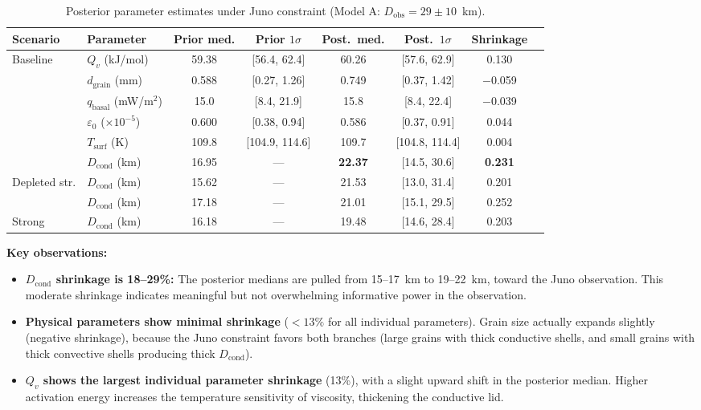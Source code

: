 \documentclass[11pt,letterpaper]{article}
\begin{document}
\begin{table}[htbp]
\centering
\caption{Posterior parameter estimates under Juno constraint (Model A: $D_\mathrm{obs} = 29 \pm 10$~km).}
\label{tab:posterior_A}
\small
\begin{tabular}{@{}llcccccc@{}}
\toprule
\textbf{Scenario} & \textbf{Parameter} & \textbf{Prior med.} & \textbf{Prior $1\sigma$} & \textbf{Post.\ med.} & \textbf{Post.\ $1\sigma$} & \textbf{Shrinkage} \\
\midrule
\multirow{5}{*}{Baseline}
  & $Q_v$ (kJ/mol) & 59.38 & [56.4, 62.4] & 60.26 & [57.6, 62.9] & 0.130 \\
  & $d_\mathrm{grain}$ (mm) & 0.588 & [0.27, 1.26] & 0.749 & [0.37, 1.42] & $-$0.059 \\
  & $q_\mathrm{basal}$ (mW/m$^2$) & 15.0 & [8.4, 21.9] & 15.8 & [8.4, 22.4] & $-$0.039 \\
  & $\varepsilon_0$ ($\times 10^{-5}$) & 0.600 & [0.38, 0.94] & 0.586 & [0.37, 0.91] & 0.044 \\
  & $T_\mathrm{surf}$ (K) & 109.8 & [104.9, 114.6] & 109.7 & [104.8, 114.4] & 0.004 \\
\cmidrule{2-7}
  & $D_\mathrm{cond}$ (km) & 16.95 & --- & \textbf{22.37} & [14.5, 30.6] & \textbf{0.231} \\
\midrule
\multirow{2}{*}{Depleted str.}
  & $D_\mathrm{cond}$ (km) & 15.62 & --- & 21.53 & [13.0, 31.4] & 0.201 \\
\multirow{2}{*}{Moderate}
  & $D_\mathrm{cond}$ (km) & 17.18 & --- & 21.01 & [15.1, 29.5] & 0.252 \\
\multirow{2}{*}{Strong}
  & $D_\mathrm{cond}$ (km) & 16.18 & --- & 19.48 & [14.6, 28.4] & 0.203 \\
\bottomrule
\end{tabular}
\end{table}

\textbf{Key observations:}
\begin{itemize}[nosep]
  \item \textbf{$D_\mathrm{cond}$ shrinkage is 18--29\%:} The posterior medians are pulled from 15--17~km to 19--22~km, toward the Juno observation. This moderate shrinkage indicates meaningful but not overwhelming informative power in the observation.
  \item \textbf{Physical parameters show minimal shrinkage} ($< 13\%$ for all individual parameters). Grain size actually expands slightly (negative shrinkage), because the Juno constraint favors both branches (large grains with thick conductive shells, and small grains with thick convective shells producing thick $D_\mathrm{cond}$).
  \item \textbf{$Q_v$ shows the largest individual parameter shrinkage} (13\%), with a slight upward shift in the posterior median. Higher activation energy increases the temperature sensitivity of viscosity, thickening the conductive lid.
\end{itemize}
\end{document}
